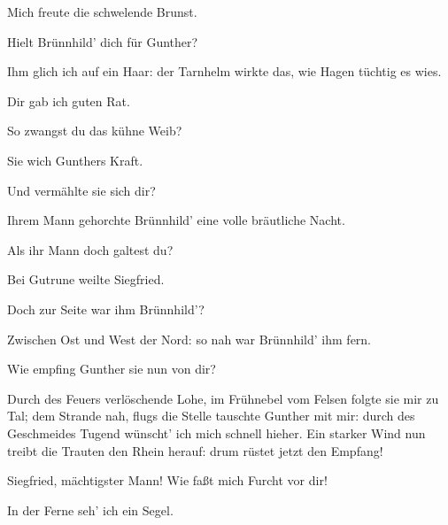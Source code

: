 \begin{drama}
\Siegfriedspeaks

Mich freute die schwelende Brunst.
 

\Gutrunespeaks

Hielt Brünnhild' dich für Gunther?
 

\Siegfriedspeaks

Ihm glich ich auf ein Haar:
der Tarnhelm wirkte das,
wie Hagen tüchtig es wies.
 

\Hagenspeaks

Dir gab ich guten Rat.
 

\Gutrunespeaks

So zwangst du das kühne Weib?
 

\Siegfriedspeaks

Sie wich Gunthers Kraft.
 

\Gutrunespeaks

Und vermählte sie sich dir?
 

\Siegfriedspeaks

Ihrem Mann gehorchte Brünnhild'
eine volle bräutliche Nacht.
 

\Gutrunespeaks

Als ihr Mann doch galtest du?
 

\Siegfriedspeaks

Bei Gutrune weilte Siegfried.
 

\Gutrunespeaks

Doch zur Seite war ihm Brünnhild'?
 

\Siegfriedspeaks



Zwischen Ost und West der Nord:
so nah war Brünnhild' ihm fern.
 

\Gutrunespeaks

Wie empfing Gunther sie nun von dir?
 

\Siegfriedspeaks

Durch des Feuers verlöschende Lohe,
im Frühnebel vom Felsen folgte sie mir zu Tal;
dem Strande nah,
flugs die Stelle tauschte Gunther mit mir:
durch des Geschmeides Tugend
wünscht' ich mich schnell hieher.
Ein starker Wind nun treibt
die Trauten den Rhein herauf:
drum rüstet jetzt den Empfang!
 

\Gutrunespeaks

Siegfried, mächtigster Mann!
Wie faßt mich Furcht vor dir!
 

\Hagenspeaks



In der Ferne seh' ich ein Segel.
 


\end{drama}
